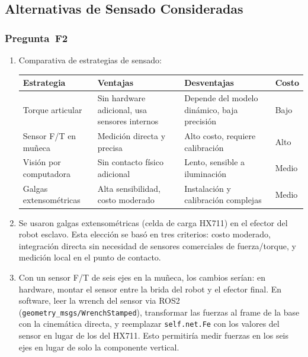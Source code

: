 \documentclass[journal,10pt,twoside]{IEEEtran}
\begin{document}
\subsection{Alternativas de Sensado Consideradas}

\subsubsection*{Pregunta~F2}

\begin{enumerate}[label=(\alph*)]

\item Comparativa de estrategias de sensado:

\begin{center}
\footnotesize
\setlength{\tabcolsep}{3pt}
\renewcommand{\arraystretch}{1.0}
\begin{tabular}{p{2.2cm}p{2.1cm}p{2.2cm}p{1.3cm}}
  \toprule
  \textbf{Estrategia} & \textbf{Ventajas} & \textbf{Desventajas} & \textbf{Costo} \\
  \midrule
  Torque articular
    & Sin hardware adicional, usa sensores internos
    & Depende del modelo dinámico, baja precisión
    & Bajo \\
  Sensor F/T en muñeca
    & Medición directa y precisa
    & Alto costo, requiere calibración
    & Alto \\
  Visión por computadora
    & Sin contacto físico adicional
    & Lento, sensible a iluminación
    & Medio \\
  Galgas extensométricas
    & Alta sensibilidad, costo moderado
    & Instalación y calibración complejas
    & Medio \\
  \bottomrule
\end{tabular}
\end{center}

\item Se usaron galgas extensométricas (celda de carga HX711) en el
efector del robot esclavo. Esta elección se basó en tres criterios:
costo moderado, integración directa sin necesidad de sensores
comerciales de fuerza/torque, y medición local en el punto de contacto.

\item Con un sensor F/T de seis ejes en la muñeca, los cambios serían:
en hardware, montar el sensor entre la brida del robot y el efector
final. En software, leer la wrench del sensor via ROS2
(\texttt{geometry\_msgs/WrenchStamped}), transformar las fuerzas al
frame de la base con la cinemática directa, y reemplazar
\texttt{self.net.Fe} con los valores del sensor en lugar de los del
HX711. Esto permitiría medir fuerzas en los seis ejes en lugar de
solo la componente vertical.

\end{enumerate}
\end{document}
